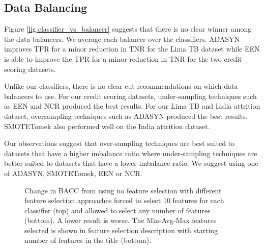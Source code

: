 \documentclass{sig-alternate-05-2015}
\begin{document}
	
	
	\subsection{Data Balancing}
	Figure \ref{fig:classifier_vs_balancer} suggests that there is no clear winner among the data balancers. We average each balancer over the classifiers. ADASYN improves TPR for a minor reduction in TNR for the Lima TB dataset while EEN is able to improve the TPR for a minor reduction in TNR for the two credit scoring datasets.
	
	Unlike our classifiers, there is no clear-cut recommendations on which data balancers to use. For our credit scoring datasets, under-sampling techniques such as EEN and NCR produced the best results. For our Lima TB and India attrition dataset, oversampling techniques such as ADASYN produced the best results. SMOTETomek also performed well on the India attrition dataset.
	
	Our observations suggest that over-sampling techniques are best suited to datasets that have a higher imbalance ratio where under-sampling techniques are better suited to datasets that have a lower imbalance ratio. We suggest using one of ADASYN, SMOTETomek, EEN or NCR.
	
	
	\begin{figure}
		\vspace{-5em}
		\centering
		\caption{Change in BACC from using no feature selection with different feature selection approaches forced to select 10 features for each classifier (top) and allowed to select any number of features (bottom). A lower result is worse. The Min-Avg-Max features selected is shown in feature selection description with starting number of features in the title (bottom). }
		\label{fig:feature_selection_limit_15}
		\vspace{-0em}
	\end{figure}
	
\end{document}
